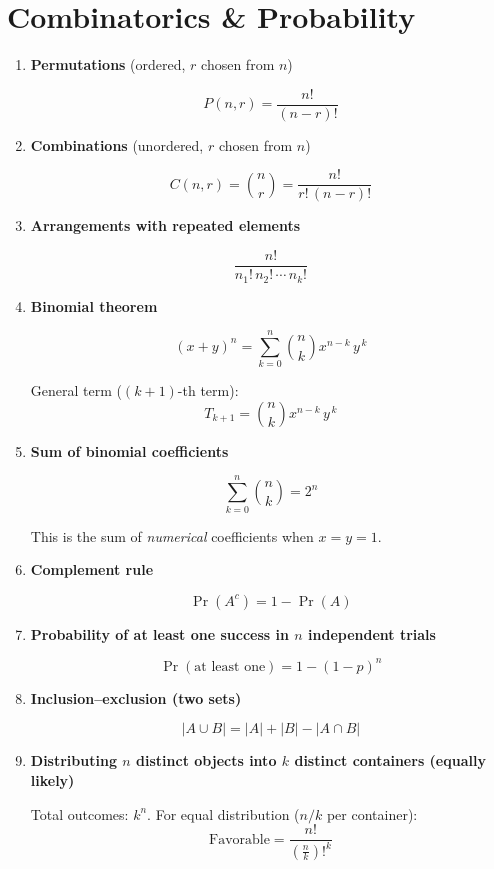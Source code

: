 \documentclass[10pt,letterpaper]{article}
\begin{document}
\section{Combinatorics \& Probability}

\begin{enumerate}

\item \textbf{Permutations} (ordered, $r$ chosen from $n$)

$$P(n,r) = \frac{n!}{(n-r)!}$$

\item \textbf{Combinations} (unordered, $r$ chosen from $n$)

$$C(n,r) = \binom{n}{r} = \frac{n!}{r!\,(n-r)!}$$

\item \textbf{Arrangements with repeated elements}

$$\frac{n!}{n_1!\,n_2!\,\cdots\,n_k!}$$

\item \textbf{Binomial theorem}

$$(x+y)^n = \sum_{k=0}^{n} \binom{n}{k} x^{n-k}\,y^{\,k}$$

General term ($(k+1)$-th term):
$$T_{k+1} = \binom{n}{k} x^{n-k}\,y^{\,k}$$

\item \textbf{Sum of binomial coefficients}

$$\sum_{k=0}^{n}\binom{n}{k} = 2^n$$

This is the sum of \emph{numerical} coefficients when $x=y=1$.

\item \textbf{Complement rule}

$$\Pr(A^c) = 1 - \Pr(A)$$

\item \textbf{Probability of at least one success in $n$ independent trials}

$$\Pr(\text{at least one}) = 1-(1-p)^n$$

\item \textbf{Inclusion--exclusion (two sets)}

$$|A \cup B| = |A| + |B| - |A \cap B|$$

\item \textbf{Distributing $n$ distinct objects into $k$ distinct containers (equally likely)}

Total outcomes: $k^n$. For equal distribution ($n/k$ per container):
$$\text{Favorable} = \frac{n!}{\left(\frac{n}{k}\right)!^k}$$

\end{enumerate}
\end{document}
